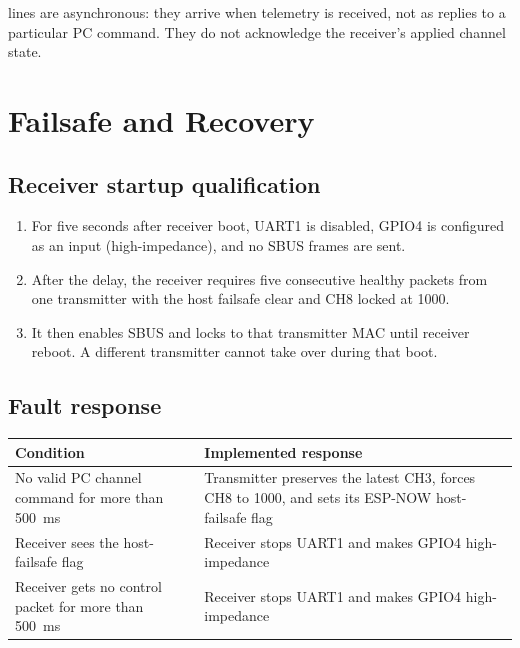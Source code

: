 \documentclass[11pt,a4paper]{article}
\newcommand{\code}[1]{\texttt{\detokenize{#1}}}
\begin{document}
\code{RECEIVER_STATUS} lines are asynchronous: they arrive when telemetry is
received, not as replies to a particular PC command. They do not acknowledge
the receiver's applied channel state.

\section{Failsafe and Recovery}
\label{sec:failsafe}

\subsection{Receiver startup qualification}

\begin{enumerate}
  \item For five seconds after receiver boot, UART1 is disabled, GPIO4 is
        configured as an input (high-impedance), and no SBUS frames are sent.
  \item After the delay, the receiver requires five consecutive healthy packets
        from one transmitter with the host failsafe clear and CH8 locked at
        1000.
  \item It then enables SBUS and locks to that transmitter MAC until receiver
        reboot. A different transmitter cannot take over during that boot.
\end{enumerate}

\Needspace{0.42\textheight}
\subsection{Fault response}

\begin{table}[ht]
\centering
\begin{tabularx}{\textwidth}{@{}YY@{}}
\toprule
Condition & Implemented response \\
\midrule
No valid PC channel command for more than 500~ms & Transmitter preserves the latest CH3, forces CH8 to 1000, and sets its ESP-NOW host-failsafe flag \\
Receiver sees the host-failsafe flag & Receiver stops UART1 and makes GPIO4 high-impedance \\
Receiver gets no control packet for more than 500~ms & Receiver stops UART1 and makes GPIO4 high-impedance \\
\bottomrule
\end{tabularx}
\end{table}
\end{document}
